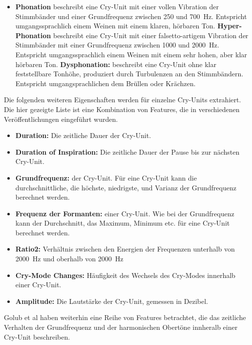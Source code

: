 \begin{itemize}
	 \item \textbf{Phonation} beschreibt eine Cry-Unit mit einer \glqq vollen Vibration der Stimmbänder\grqq{} und einer Grundfrequenz zwischen 250 und \SI{700}{\hertz}. Entspricht umgangssprachlich einem Weinen mit einem \glqq klaren, hörbaren Ton\grqq{}.
	 \textbf{Hyper-Phonation} beschreibt eine Cry-Unit mit einer \glqq falsetto-artigem Vibration der Stimmbänder\grqq{} mit einer Grundfrequenz zwischen 1000 und \SI{2000}{\hertz}. Entspricht umgangssprachlich einem Weinen mit einem \glqq sehr hohen, aber klar hörbaren Ton\grqq{}.
	 \textbf{Dysphonation:} beschreibt eine Cry-Unit ohne klar feststellbare Tonhöhe, produziert durch Turbulenzen an den Stimmbändern. Entspricht umgangsprachlichen dem \glqq Brüllen oder Krächzen\grqq{}.
\end{itemize}

Die folgenden weiteren Eigenschaften werden für einzelne Cry-Units extrahiert. Die hier gezeigte Liste ist eine Kombination von Features, die in verschiedenen Veröffentlichungen eingeführt wurden.

\begin{itemize}
	\item \textbf{Duration:} Die zeitliche Dauer der Cry-Unit.
	\item \textbf{Duration of Inspiration: }Die zeitliche Dauer der Pause bis zur nächsten Cry-Unit.
	\item \textbf{Grundfrequenz:} der Cry-Unit. Für eine Cry-Unit kann die durchschnittliche, die höchste, niedrigste, und Varianz der Grundfrequenz berechnet werden.
	\item \textbf{Frequenz der Formanten:} einer Cry-Unit. Wie bei der Grundfrequenz kann der Durchschnitt, das Maximum, Minimum etc. für eine Cry-Unit berechnet werden.
	\item \textbf{Ratio2: } Verhältnis zwischen den Energien der Frequenzen unterhalb von \SI{2000}{\hertz} und oberhalb von \SI{2000}{\hertz}
	\item \textbf{Cry-Mode Changes:} Häufigkeit des Wechsels des Cry-Modes innerhalb einer Cry-Unit.
	\item \textbf{Amplitude:} Die Lautstärke der Cry-Unit, gemessen in Dezibel. \cite[S. 85]{parentalPerception} \cite[S. 156]{threeCryTypes}
\end{itemize}

Golub et al haben weiterhin eine Reihe von Features betrachtet, die das zeitliche Verhalten der Grundfrequenz und der harmonischen Obertöne innheralb einer Cry-Unit beschreiben. \cite[S. 73]{cryModel}

